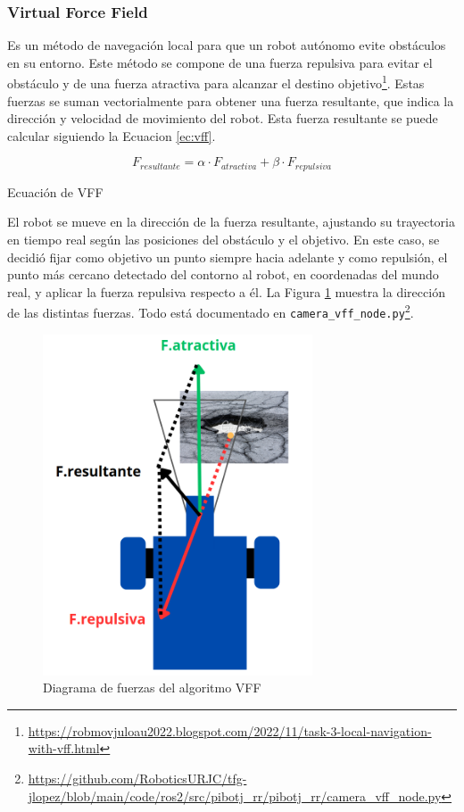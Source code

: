 \subsubsection{Virtual Force Field}
\label{subsubsec:vff}

Es un método de navegación local para que un robot autónomo evite obstáculos en su entorno. Este método se compone de una fuerza repulsiva para evitar el obstáculo y de una fuerza atractiva para alcanzar el destino objetivo\footnote{\url{https://robmovjuloau2022.blogspot.com/2022/11/task-3-local-navigation-with-vff.html}}. Estas fuerzas se suman vectorialmente para obtener una fuerza resultante, que indica la dirección y velocidad de movimiento del robot. Esta fuerza resultante se puede calcular siguiendo la Ecuacion \ref{ec:vff}.

\begin{myequation}[h]
	\begin{equation}
		F_{resultante} = \alpha \cdot F_{atractiva} + \beta \cdot F_{repulsiva}
		\nonumber
	\end{equation}
	\caption[Ecuación de VFF]{Ecuación de VFF}
	\label{ec:vff}
\end{myequation} 

El robot se mueve en la dirección de la fuerza resultante, ajustando su trayectoria en tiempo real según las posiciones del obstáculo y el objetivo. En este caso, se decidió fijar como objetivo un punto siempre hacia adelante y como repulsión, el punto más cercano detectado del contorno al robot, en coordenadas del mundo real, y aplicar la fuerza repulsiva respecto a él. La Figura \ref{fig:vfffuerzas} muestra la dirección de las distintas fuerzas. Todo está documentado en \verb|camera_vff_node.py|\footnote{\url{https://github.com/RoboticsURJC/tfg-jlopez/blob/main/code/ros2/src/pibotj_rr/pibotj_rr/camera_vff_node.py}}.


 \begin{figure} [h!]
	\begin{center}
		\includegraphics[width=8cm]{figs/cap6/vff.png}
	\end{center}
	\caption{Diagrama de fuerzas del algoritmo VFF}
	\label{fig:vfffuerzas}
\end{figure}

